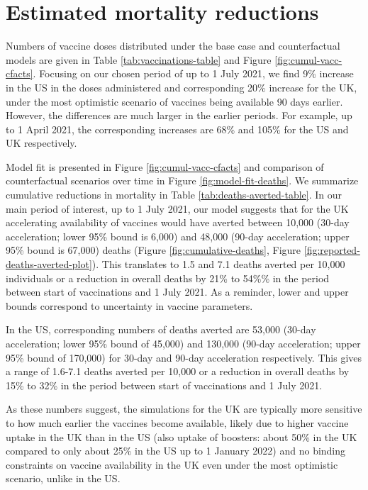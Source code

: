 \documentclass{article}
\begin{document}
\section{Estimated mortality reductions}\label{estimated-mortality-reductions}

Numbers of vaccine doses distributed under the base case and counterfactual models are given in Table \ref{tab:vaccinations-table} and Figure \ref{fig:cumul-vacc-cfacts}. Focusing on our chosen period of up to 1 July 2021, we find 9\% increase in the US in the doses administered and corresponding 20\% increase for the UK, under the most optimistic scenario of vaccines being available 90 days earlier. However, the differences are much larger in the earlier periods. For example, up to 1 April 2021, the corresponding increases are 68\% and 105\% for the US and UK respectively.

Model fit is presented in Figure \ref{fig:cumul-vacc-cfacts} and comparison of counterfactual scenarios over time in Figure \ref{fig:model-fit-deaths}. We summarize cumulative reductions in mortality in Table \ref{tab:deaths-averted-table}. In our main period of interest, up to 1 July 2021, our model suggests that for the UK accelerating availability of vaccines would have averted between 10,000 (30-day acceleration; lower 95\% bound is 6,000) and 48,000 (90-day acceleration; upper 95\% bound is 67,000) deaths (Figure \ref{fig:cumulative-deaths}, Figure \ref{fig:reported-deaths-averted-plot}). This translates to 1.5 and 7.1 deaths averted per 10,000 individuals or a reduction in overall deaths by 21\% to 54\%\% in the period between start of vaccinations and 1 July 2021. As a reminder, lower and upper bounds correspond to uncertainty in vaccine parameters.

In the US, corresponding numbers of deaths averted are 53,000 (30-day acceleration; lower 95\% bound of 45,000) and 130,000 (90-day acceleration; upper 95\% bound of 170,000) for 30-day and 90-day acceleration respectively. This gives a range of 1.6-7.1 deaths averted per 10,000 or a reduction in overall deaths by 15\% to 32\% in the period between start of vaccinations and 1 July 2021.

As these numbers suggest, the simulations for the UK are typically more sensitive to how much earlier the vaccines become available, likely due to higher vaccine uptake in the UK than in the US (also uptake of boosters: about 50\% in the UK compared to only about 25\% in the US up to 1 January 2022) and no binding constraints on vaccine availability in the UK even under the most optimistic scenario, unlike in the US.
\end{document}

